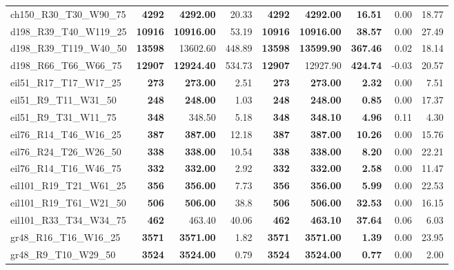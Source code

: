 \documentclass{singlecol-new}
\begin{document}
{\begin{longtable}{lrrrrrrrr}
		ch150\_R30\_T30\_W90\_75 & \textbf{4292} & \textbf{4292.00} & 20.33 & \textbf{4292} & \textbf{4292.00} & \textbf{16.51} & 0.00 & 18.77 \\
		d198\_R39\_T40\_W119\_25 & \textbf{10916} & \textbf{10916.00} & 53.19 & \textbf{10916} & \textbf{10916.00} & \textbf{38.57} & 0.00 & 27.49 \\
		d198\_R39\_T119\_W40\_50 & \textbf{13598} & 13602.60 & 448.89 & \textbf{13598} & \textbf{13599.90} & \textbf{367.46} & 0.02 & 18.14 \\
		d198\_R66\_T66\_W66\_75 & \textbf{12907} & \textbf{12924.40} & 534.73 & \textbf{12907} & 12927.90 & \textbf{424.74} & -0.03 & 20.57 \\
		eil51\_R17\_T17\_W17\_25 & \textbf{273} & \textbf{273.00} & 2.51 & \textbf{273} & \textbf{273.00} & \textbf{2.32} & 0.00 & 7.51 \\
		eil51\_R9\_T11\_W31\_50 & \textbf{248} & \textbf{248.00} & 1.03 & \textbf{248} & \textbf{248.00} & \textbf{0.85} & 0.00 & 17.37 \\
		eil51\_R9\_T31\_W11\_75 & \textbf{348} & 348.50 & 5.18 & \textbf{348} & \textbf{348.10} & \textbf{4.96} & 0.11 & 4.30 \\
		eil76\_R14\_T46\_W16\_25 & \textbf{387} & \textbf{387.00} & 12.18 & \textbf{387} & \textbf{387.00} & \textbf{10.26} & 0.00 & 15.76 \\
		eil76\_R24\_T26\_W26\_50 & \textbf{338} & \textbf{338.00} & 10.54 & \textbf{338} & \textbf{338.00} & \textbf{8.20} & 0.00 & 22.21 \\
		eil76\_R14\_T16\_W46\_75 & \textbf{332} & \textbf{332.00} & 2.92 & \textbf{332} & \textbf{332.00} & \textbf{2.58} & 0.00 & 11.47 \\
		eil101\_R19\_T21\_W61\_25 & \textbf{356} & \textbf{356.00} & 7.73 & \textbf{356} & \textbf{356.00} & \textbf{5.99} & 0.00 & 22.53 \\
		eil101\_R19\_T61\_W21\_50 & \textbf{506} & \textbf{506.00} & 38.8 & \textbf{506} & \textbf{506.00} & \textbf{32.53} & 0.00 & 16.15 \\
		eil101\_R33\_T34\_W34\_75 & \textbf{462} & 463.40 & 40.06 & \textbf{462} & \textbf{463.10} & \textbf{37.64} & 0.06 & 6.03 \\
		gr48\_R16\_T16\_W16\_25 & \textbf{3571} & \textbf{3571.00} & 1.82 & \textbf{3571} & \textbf{3571.00} & \textbf{1.39} & 0.00 & 23.95 \\
		gr48\_R9\_T10\_W29\_50 & \textbf{3524} & \textbf{3524.00} & 0.79 & \textbf{3524} & \textbf{3524.00} & \textbf{0.77} & 0.00 & 2.00 \\

\end{longtable}}
\end{document}
